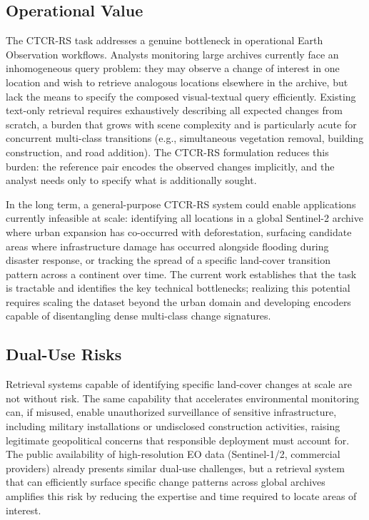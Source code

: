 \subsection{Operational Value}
\label{sec:chap7_impact_value}
 
The CTCR-RS task addresses a genuine bottleneck in
operational Earth Observation workflows. Analysts monitoring
large archives currently face an inhomogeneous query
problem: they may observe a change of interest in one
location and wish to retrieve analogous locations elsewhere
in the archive, but lack the means to specify the composed
visual-textual query efficiently. Existing text-only
retrieval requires exhaustively describing all expected
changes from scratch, a burden that grows with scene
complexity and is particularly acute for concurrent
multi-class transitions (e.g., simultaneous vegetation
removal, building construction, and road addition). The
CTCR-RS formulation reduces this burden: the reference
pair encodes the observed changes implicitly, and the
analyst needs only to specify what is additionally sought.
 
In the long term, a general-purpose CTCR-RS system could
enable applications currently infeasible at scale:
identifying all locations in a global Sentinel-2 archive
where urban expansion has co-occurred with deforestation,
surfacing candidate areas where infrastructure damage has
occurred alongside flooding during disaster response, or
tracking the spread of a specific land-cover transition
pattern across a continent over time. The current work
establishes that the task is tractable and identifies the
key technical bottlenecks; realizing this potential
requires scaling the dataset beyond the urban domain and
developing encoders capable of disentangling dense
multi-class change signatures.
 
\subsection{Dual-Use Risks}
\label{sec:chap7_impact_risks}
 
Retrieval systems capable of identifying specific land-cover
changes at scale are not without risk. The same capability
that accelerates environmental monitoring can, if misused,
enable unauthorized surveillance of sensitive
infrastructure, including military installations or
undisclosed construction activities, raising legitimate
geopolitical concerns that responsible deployment must
account for. The public availability of high-resolution EO
data (Sentinel-1/2, commercial providers) already presents
similar dual-use challenges, but a retrieval system that
can efficiently surface specific change patterns across
global archives amplifies this risk by reducing the
expertise and time required to locate areas of interest.
 

